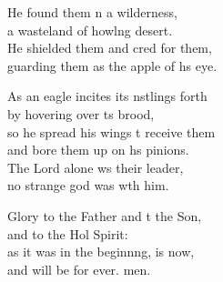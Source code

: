 \begin{psalmverse}
\begin{patverse}
He found them \pointup{\i}n a wilderness,\Med\\
a wasteland of howl\pointup{\i}ng desert.\\
He shielded them and cred for them,\Med\\
guarding them as the apple of h\pointup{\i}s eye.

As an eagle incites its nstlings forth\Med\\
by hovering over \pointup{\i}ts brood,\\
so he spread his wings t receive them\Med\\
and bore them up on h\pointup{\i}s pinions.\\
The Lord alone ws their leader,\Med\\
no strange god was w\pointup{\i}th him.

Glory to the Father and t the Son,\Med\\
and to the Hol Spirit:\\
as it was in the beginn\pointup{\i}ng, is now,\Med\\
and will be for ever. men.
  \end{patverse}
\end{psalmverse}
